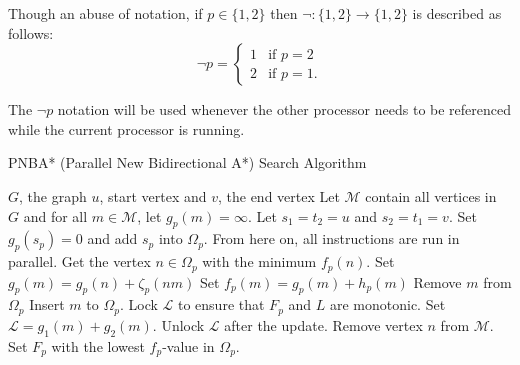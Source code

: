 Though an abuse of notation, if $p\in\{1,2\}$ then $\neg:\{1,2\}\to\{1,2\}$ is described as follows:
$$
\neg p=\begin{cases}
    1 & \text{if } p=2 \\ 
    2 & \text{if } p = 1.
\end{cases}
$$

The $\neg p$ notation will be used whenever the other processor needs to be referenced while the current processor is running.

\begin{algorithm}[H]
    \caption{PNBA* (Parallel New Bidirectional A*) Search Algorithm}
    \begin{algorithmic}
        \REQUIRE $G$, the graph 
        \REQUIRE $u$, start vertex and $v$, the end vertex
        \STATE Let $\mathcal{M}$ contain all vertices in $G$ and for all $m\in\mathcal{M}$, let $g_p(m)=\infty$.
        \STATE Let $s_1=t_2=u$ and $s_2=t_1=v$.
        \STATE Set $g_p(s_p) = 0$ and add $s_p$ into $\Omega_p$.
        \STATE From here on, all instructions are run in parallel.
            \STATE Get the vertex $n\in\Omega_p$ with the minimum $f_p(n)$.
                            \STATE Set $g_p(m)=g_p(n)+\zeta_p(nm)$
                            \STATE Set $f_p(m)=g_p(m)+h_p(m)$
                                \STATE Remove $m$ from $\Omega_p$ 
                            \ENDIF
                            \STATE Insert $m$ to $\Omega_p$.
                                \STATE Lock $\mathcal{L}$ to ensure that $F_p$ and $L$ are monotonic.
                                    \STATE Set $\mathcal{L}=g_1(m)+g_2(m)$.
                                \ENDIF
                                \STATE Unlock $\mathcal{L}$ after the update.
                            \ENDIF
                        \ENDIF
                    \ENDFOR
                \ENDIF
                \STATE Remove vertex $n$ from $\mathcal{M}$.
            \ENDIF
                \STATE Set $F_p$ with the lowest $f_p$-value in $\Omega_p$.
            \ENDIF
        \ENDWHILE
    \end{algorithmic}
\end{algorithm}

